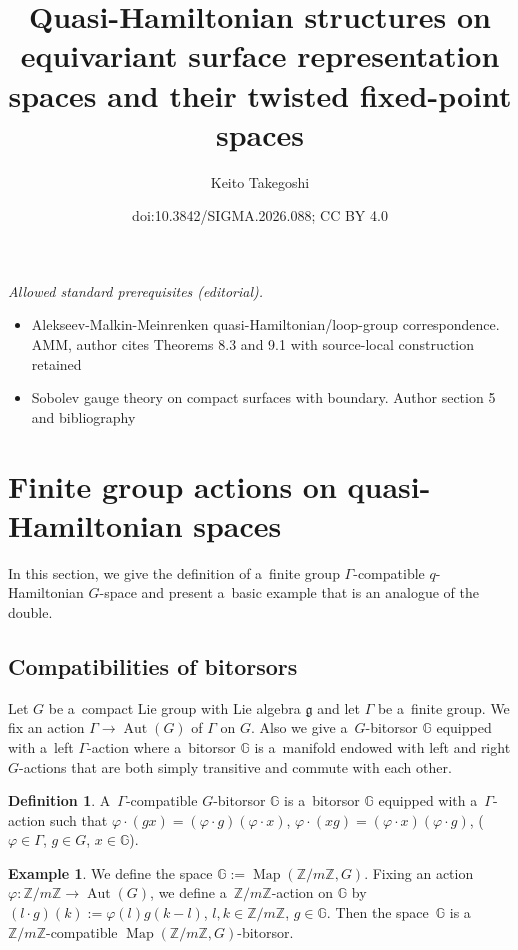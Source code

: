 \documentclass[10pt,a4paper]{amsart}
\title{Quasi-Hamiltonian structures on equivariant surface representation spaces and their twisted fixed-point spaces}
\author{Keito Takegoshi}
\date{doi:10.3842/SIGMA.2026.088; CC BY 4.0}
\numberwithin{equation}{section}
\theoremstyle{definition}
\newtheorem{Definition}[Theorem]{Definition}
\newtheorem{Example}[Theorem]{Example}
\newcommand{\Map}{\operatorname{Map}}
\newcommand{\Aut}{\operatorname{Aut}}
\newcommand{\bG}{\mathbb{G}}
\newcommand{\bZ}{\mathbb{Z}}
\begin{document}
\maketitle
\noindent\textit{Allowed standard prerequisites (editorial).}\begin{itemize}
\item Alekseev-Malkin-Meinrenken quasi-Hamiltonian/loop-group correspondence. AMM, author cites Theorems 8.3 and 9.1 with source-local construction retained
\item Sobolev gauge theory on compact surfaces with boundary. Author section 5 and bibliography
\end{itemize}\medskip
\section{Finite group actions on quasi-Hamiltonian spaces}\label{2Fin_grp_act_q-Ham_sp}
In this section, we give the definition of a~finite group $\Gamma$-compatible $q$-Hamiltonian $G$-space and present a~basic example that is an analogue of the double.

\subsection{Compatibilities of bitorsors}

Let $G$ be a~compact Lie group with Lie algebra $\mathfrak{g}$ and let $\Gamma$ be a~finite group. We fix an action $\Gamma \to \Aut(G)$ of $\Gamma$ on $G$.
Also we give a~$G$-bitorsor $\bG$ equipped with a~left $\Gamma$-action where a~bitorsor $\bG$ is a~manifold endowed with left and right $G$-actions that are both simply transitive and commute with each other.

\begin{Definition} A~$\Gamma$-compatible $G$-bitorsor $\bG$ is a~bitorsor $\bG$ equipped with a~$\Gamma$-action such that $
 \varphi \cdot (g x) = (\varphi \cdot g)(\varphi \cdot x)$, $
 \varphi \cdot (x g) = (\varphi \cdot x)(\varphi \cdot g)$, ($
 \varphi \in \Gamma$, $ g \in G$, $ x \in \bG$).
\end{Definition}

\begin{Example}\label{exam_bitorsor}
 We define the space $\bG := \Map(\bZ/ m \bZ, G)$.
 Fixing an action $\varphi \colon \bZ/m\bZ \to \Aut(G)$, we define a~$\bZ / m \bZ $-action on $\bG$ by
$(l \cdot g)(k) := \varphi(l) g (k - l)$, $ l, k \in \bZ/ m \bZ$, $ g \in \bG$.
 Then the space~$\bG$ is a~$\bZ/ m \bZ$-compatible $\Map(\bZ/ m \bZ, G)$-bitorsor.
\end{Example}
\end{document}
